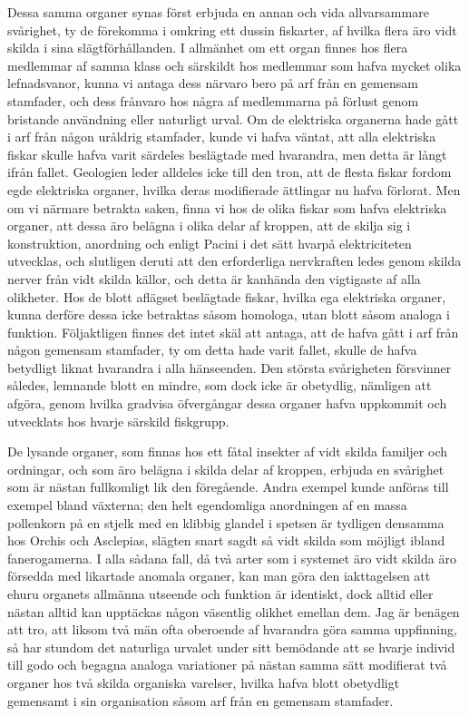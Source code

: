Dessa samma organer synas först erbjuda en annan och vida allvarsammare svårighet, ty de förekomma i omkring ett dussin fiskarter, af hvilka flera äro vidt skilda i sina slägtförhållanden. I allmänhet om ett organ finnes hos flera medlemmar af samma klass och särskildt hos medlemmar som hafva mycket olika lefnadsvanor, kunna vi antaga dess närvaro bero på arf från en gemensam stamfader, och dess frånvaro hos några af medlemmarna på förlust genom bristande användning eller naturligt urval. Om de elektriska organerna hade gått i arf från någon uråldrig stamfader, kunde vi hafva väntat, att alla elektriska fiskar skulle hafva varit särdeles beslägtade med hvarandra, men detta är långt ifrån fallet. Geologien leder alldeles icke till den tron, att de flesta fiskar fordom egde elektriska organer, hvilka deras modifierade ättlingar nu hafva förlorat. Men om vi närmare betrakta saken, finna vi hos de olika fiskar som hafva elektriska organer, att dessa äro belägna i olika delar af kroppen, att de skilja sig i konstruktion, anordning och enligt Pacini i det sätt hvarpå elektriciteten utvecklas, och slutligen deruti att den erforderliga nervkraften ledes genom skilda nerver från vidt skilda källor, och detta är kanhända den vigtigaste af alla olikheter. Hos de blott aflägset beslägtade fiskar, hvilka ega elektriska organer, kunna derföre dessa icke betraktas såsom homologa, utan blott såsom analoga i funktion. Följaktligen finnes det intet skäl att antaga, att de hafva gått i arf från någon gemensam stamfader, ty om detta hade varit fallet, skulle de hafva betydligt liknat hvarandra i alla hänseenden. Den största svårigheten försvinner således, lemnande blott en mindre, som dock icke är obetydlig, nämligen att afgöra, genom hvilka gradvisa öfvergångar dessa organer hafva uppkommit och utvecklats hos hvarje särskild fiskgrupp.

De lysande organer, som finnas hos ett fåtal insekter af vidt skilda familjer och ordningar, och som äro belägna i skilda delar af kroppen, erbjuda en svårighet som är nästan fullkomligt lik den föregående. Andra exempel kunde anföras till exempel bland växterna; den helt egendomliga anordningen af en massa pollenkorn på en stjelk med en klibbig glandel i spetsen är tydligen densamma hos Orchis och Asclepias, slägten snart sagdt så vidt skilda som möjligt ibland fanerogamerna. I alla sådana fall, då två arter som i systemet äro vidt skilda äro försedda med likartade anomala organer, kan man göra den iakttagelsen att ehuru organets allmänna utseende och funktion är identiskt, dock alltid eller nästan alltid kan upptäckas någon väsentlig olikhet emellan dem. Jag är benägen att tro, att liksom två män ofta oberoende af hvarandra göra samma uppfinning, så har stundom det naturliga urvalet under sitt bemödande att se hvarje individ till godo och begagna analoga variationer på nästan samma sätt modifierat två organer hos två skilda organiska varelser, hvilka hafva blott obetydligt gemensamt i sin organisation såsom arf från en gemensam stamfader.

